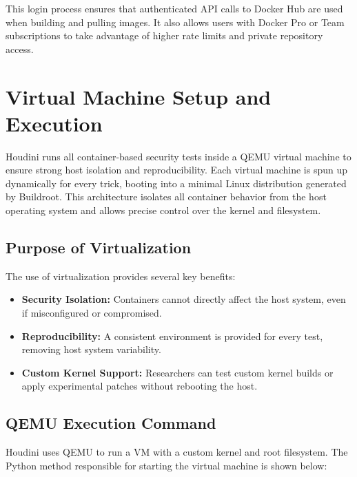 \documentclass[12pt]{report}
\begin{document}
\begin{doublespace}
This login process ensures that authenticated API calls to Docker Hub are used when building and pulling images. It also allows users with Docker Pro or Team subscriptions to take advantage of higher rate limits and private repository access.

\section{Virtual Machine Setup and Execution}

Houdini runs all container-based security tests inside a QEMU virtual machine to ensure strong host isolation and reproducibility. Each virtual machine is spun up dynamically for every trick, booting into a minimal Linux distribution generated by Buildroot. This architecture isolates all container behavior from the host operating system and allows precise control over the kernel and filesystem.

\subsection{Purpose of Virtualization}

The use of virtualization provides several key benefits:
\begin{itemize}
\item \textbf{Security Isolation:} Containers cannot directly affect the host system, even if misconfigured or compromised.
\item \textbf{Reproducibility:} A consistent environment is provided for every test, removing host system variability.
\item \textbf{Custom Kernel Support:} Researchers can test custom kernel builds or apply experimental patches without rebooting the host.
\end{itemize}

\subsection{QEMU Execution Command}

Houdini uses QEMU to run a VM with a custom kernel and root filesystem. The Python method responsible for starting the virtual machine is shown below:


\end{doublespace}
\end{document}
